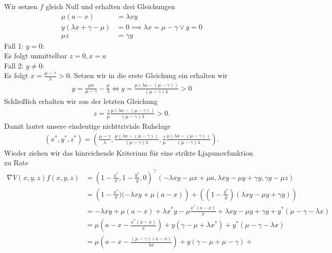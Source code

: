 \begin{solution}
Wir setzen $f$ gleich Null und erhalten drei Gleichungen
\begin{align}
  \mu (a-x) &= \lambda xy \label{1}\\
  y(\lambda x + \gamma - \mu) &= 0 \implies \lambda x  = \mu - \gamma \lor y = 0\\
  \mu z &= \gamma y \label{3}
\end{align}
Fall 1: $y = 0$: \\
Es folgt unmittelbar $z = 0, x = a$ \\
Fall 2: $y \neq 0$: \\
Es folgt $x = \frac{\mu - \gamma}{\lambda} > 0$. Setzen wir in die erste Gleichung ein
erhalten wir
\begin{align*}
  y = \frac{\mu a}{\mu - \gamma} - \frac{\mu}{\lambda}
  \iff y = \frac{\mu(\lambda a - (\mu - \gamma))}{(\mu - \gamma)\lambda} > 0
\end{align*}
Schließlich erhalten wir aus der letzten Gleichung
\begin{align*}
  z = \frac{\gamma}{\mu} \frac{\mu(\lambda a - (\mu - \gamma))}{(\mu - \gamma)\lambda} > 0.
\end{align*}
Damit lautet unsere eindeutige nichttriviale Ruhelage
\begin{align*}
  (x^*,y^*,z^*) = \left(\frac{\mu - \gamma}{\lambda},\frac{\mu(\lambda a - (\mu - \gamma))}{(\mu - \gamma)\lambda},
    \frac{\gamma}{\mu} \frac{\mu(\lambda a - (\mu - \gamma))}{(\mu - \gamma)\lambda}\right).
\end{align*}
Wieder ziehen wir das hinreichende Kriterium für eine strikte Ljapunovfunktion zu Rate
\begin{align*}
  \nabla V(x,y,z)f(x,y,z) &= \left(1 - \frac{x^*}{x}, 1 - \frac{y^*}{y}, 0\right)^{\top}
  \left(- \lambda xy - \mu x + \mu a,\lambda xy - \mu y + \gamma y, \gamma y - \mu z\right) \\
  &= \left(1 - \frac{x^*}{x})(- \lambda xy + \mu (a - x)\right) +
  \left(\left(1 - \frac{y^*}{y}\right)\left(\lambda xy - \mu y + \gamma y\right)\right) \\
  &= - \lambda xy + \mu (a - x) + \lambda x^*y - \mu \frac{x^*(a-x)}{x} + \lambda xy - \mu y + \gamma y
  + y^*(\mu - \gamma - \lambda x)  \\
  &= \mu \left(a - x - \frac{x^*(a-x)}{x}\right) + y(\gamma - \mu + \lambda x^*) + y^*(\mu - \gamma - \lambda x) \\
  &= \mu \left(a - x - \frac{(\mu - \gamma)(a-x)}{\lambda x}\right) + y(\gamma - \mu + \mu - \gamma) +

\end{align*}
\end{solution}
